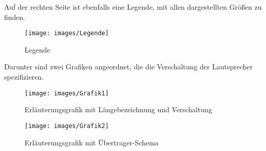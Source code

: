Auf der rechten Seite ist ebenfalls eine Legende, mit allen dargestellten Größen zu finden.

\begin{figure}[H]
\centering
\texttt{[image: images/Legende]}
\caption{Legende}
\label{fig:Legende}
\end{figure}

Darunter sind zwei Grafiken angeordnet, die die Verschaltung der Lautsprecher spezifizieren.

\begin{figure}[H]
\centering
\texttt{[image: images/Grafik1]}
\caption{Erläuterungsgrafik mit Längebezeichnung und Verschaltung}
\label{fig:Grafik1}
\end{figure} 

\begin{figure}[H]
\centering
\texttt{[image: images/Grafik2]}
\caption{Erläuterungsgrafik mit Übertrager-Schema}
\label{fig:Grafik2}
\end{figure}